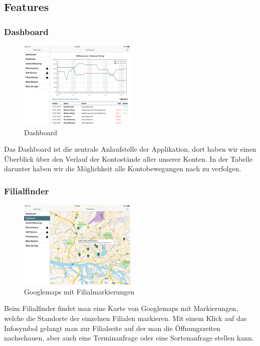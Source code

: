 \subsection{Features}
\subsubsection{Dashboard}
\begin{figure}[h]
	\centering
  \includegraphics[width=0.5\textwidth]{Pictures/Dashboard}
	\caption{Dashboard}
	\label{fig1}
\end{figure}

Das Dashboard ist die zentrale Anlaufstelle der Applikation, dort haben wir einen Überblick über den Verlauf der Kontostände aller unserer Konten. In der Tabelle darunter haben wir die Möglichkeit alle Kontobewegungen nach zu verfolgen. 


\subsubsection{Filialfinder}
\begin{figure}[h]
	\centering
  \includegraphics[width=0.5\textwidth]{Pictures/filialfinder}
	\caption{Googlemaps mit Filialmarkierungen}
	\label{fig2}
\end{figure}

	Beim Filialfinder findet man eine Karte von Googlemaps mit Markierungen, welche die Standorte der einzelnen Filialen markieren. Mit einem Klick auf das Infosymbol gelangt man zur Filialseite auf der man die Öffnungszeiten nachschauen, aber auch eine Terminanfrage oder eine Sortenanfrage stellen kann. 

